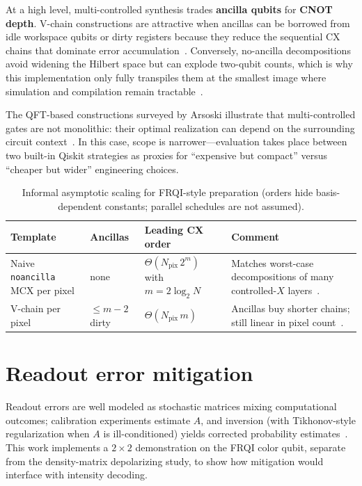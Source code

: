 At a high level, multi-controlled synthesis trades \textbf{ancilla qubits} for \textbf{CNOT depth}. V-chain constructions are attractive when ancillas can be borrowed from idle workspace qubits or dirty registers because they reduce the sequential CX chains that dominate error accumulation~\cite{Azevedo2024LowDepthMCG}. Conversely, no-ancilla decompositions avoid widening the Hilbert space but can explode two-qubit counts, which is why this implementation only fully transpiles them at the smallest image where simulation and compilation remain tractable~\cite{Zindorf2024EfficientMCG}.

The QFT-based constructions surveyed by Arsoski illustrate that multi-controlled gates are not monolithic: their optimal realization can depend on the surrounding circuit context~\cite{Arsoski2024MCXQFT}. In this case, scope is narrower---evaluation takes place between two built-in Qiskit strategies as proxies for ``expensive but compact'' versus ``cheaper but wider'' engineering choices.

\begin{table}[htbp]
\centering
\caption{Informal asymptotic scaling for FRQI-style preparation (orders hide basis-dependent constants; parallel schedules are not assumed).}
\label{tab:mcx-scaling}
\small
\begin{tabular}{p{3.6cm}p{2.4cm}p{2.4cm}p{4.6cm}}
\toprule
Template & Ancillas & Leading CX order & Comment \\
\midrule
Naive \texttt{noancilla} MCX per pixel & none & $\Theta(N_{\mathrm{pix}}\,2^{m})$ with $m{=}2\log_2 N$ & Matches worst-case decompositions of many controlled-$X$ layers~\cite{Zindorf2024EfficientMCG}. \\
V-chain per pixel & $\le m{-}2$ dirty & $\Theta(N_{\mathrm{pix}}\,m)$ & Ancillas buy shorter chains; still linear in pixel count~\cite{Vale2023MCSU2,Azevedo2024LowDepthMCG}. \\
\bottomrule
\end{tabular}
\end{table}

\section{Readout error mitigation}
Readout errors are well modeled as stochastic matrices mixing computational outcomes; calibration experiments estimate $A$, and inversion (with Tikhonov-style regularization when $A$ is ill-conditioned) yields corrected probability estimates~\cite{Mu2025GuidedImageFiltering}. This work implements a $2\times 2$ demonstration on the FRQI color qubit, separate from the density-matrix depolarizing study, to show how mitigation would interface with intensity decoding.

